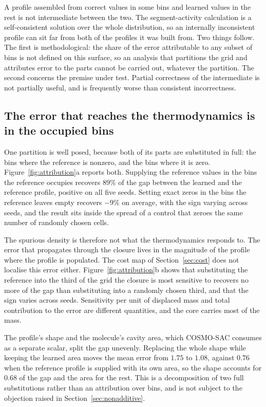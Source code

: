 A profile assembled from correct values in some bins and learned values in the rest is not
intermediate between the two. The segment-activity calculation is a self-consistent solution over
the whole distribution, so an internally inconsistent profile can sit far from both of the
profiles it was built from. Two things follow. The first is methodological: the share of the error
attributable to any subset of bins is not defined on this surface, so an analysis that partitions
the grid and attributes error to the parts cannot be carried out, whatever the partition. The
second concerns the premise under test. Partial correctness of the intermediate is not partially
useful, and is frequently worse than consistent incorrectness.

\subsection{The error that reaches the thermodynamics is in the occupied bins}
\label{sec:attribution}

One partition is well posed, because both of its parts are substituted in full: the bins where the
reference is nonzero, and the bins where it is zero. Figure~\ref{fig:attribution}a reports both.
Supplying the reference values in the bins the reference occupies recovers $89\%$ of the gap
between the learned and the reference profile, positive on all five seeds. Setting exact zeros in
the bins the reference leaves empty recovers $-9\%$ on average, with the sign varying across
seeds, and the result sits inside the spread of a control that zeroes the same number of randomly
chosen cells.

The spurious density is therefore not what the thermodynamics responds to. The error that
propagates through the closure lives in the magnitude of the profile where the profile is
populated. The cost map of Section~\ref{sec:cost} does not localise this error either.
Figure~\ref{fig:attribution}b shows that substituting the reference into the third of the grid the
closure is most sensitive to recovers no more of the gap than substituting into a randomly chosen
third, and that the sign varies across seeds. Sensitivity per unit of displaced mass and total
contribution to the error are different quantities, and the core carries most of the mass.

The profile's shape and the molecule's cavity area, which COSMO-SAC consumes as a separate scalar,
split the gap unevenly. Replacing the whole shape while keeping the learned area moves the mean
error from $1.75$ to $1.08$, against $0.76$ when the reference profile is supplied with its own
area, so the shape accounts for $0.68$ of the gap and the area for the rest. This is a
decomposition of two full substitutions rather than an attribution over bins, and is not subject
to the objection raised in Section~\ref{sec:nonadditive}.

